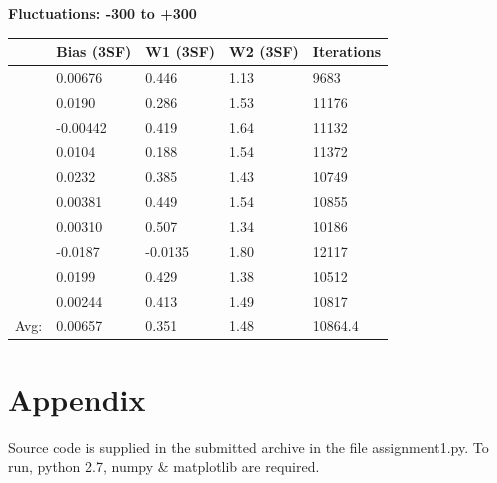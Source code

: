 \documentclass{article}
\begin{document}
\begin{center}
    \textbf{Fluctuations: -300 to +300}        \\
    \begin{tabular}{ r | l | l | l | l }
        \hline
        & Bias (3SF) & W1 (3SF) & W2 (3SF) & Iterations \\
        \hline
& 0.00676& 0.446& 1.13& 9683 \\
& 0.0190& 0.286& 1.53& 11176 \\
& -0.00442& 0.419& 1.64& 11132 \\
& 0.0104& 0.188& 1.54& 11372 \\
& 0.0232& 0.385& 1.43& 10749 \\
& 0.00381& 0.449& 1.54& 10855 \\
& 0.00310& 0.507& 1.34& 10186 \\
& -0.0187& -0.0135& 1.80& 12117 \\
& 0.0199& 0.429& 1.38& 10512 \\
& 0.00244& 0.413& 1.49& 10817 \\
        \hline
        Avg: & 0.00657& 0.351& 1.48&10864.4\\
        \hline
    \end{tabular}
\end{center}

\section*{Appendix}
Source code is supplied in the submitted archive in the file assignment1.py. To run, python 2.7, numpy \& matplotlib are required.
\end{document}
